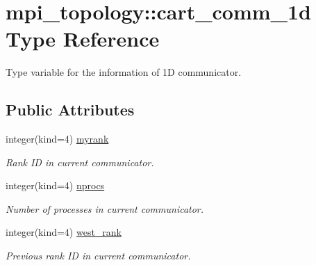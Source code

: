 \hypertarget{structmpi__topology_1_1cart__comm__1d}{}\section{mpi\+\_\+topology\+:\+:cart\+\_\+comm\+\_\+1d Type Reference}
\label{structmpi__topology_1_1cart__comm__1d}


Type variable for the information of 1D communicator.  


\subsection*{Public Attributes}
\begin{DoxyCompactItemize}
\item 
\mbox{\label{structmpi__topology_1_1cart__comm__1d_af8e266e09b59c9feb0192d6a045f5e25}} 
integer(kind=4) \hyperlink{structmpi__topology_1_1cart__comm__1d_af8e266e09b59c9feb0192d6a045f5e25}{myrank}
\begin{DoxyCompactList}\small\item\em Rank ID in current communicator. \end{DoxyCompactList}\item 
\mbox{\label{structmpi__topology_1_1cart__comm__1d_a7272e89eb5b98625a78eedbdbe3eccab}} 
integer(kind=4) \hyperlink{structmpi__topology_1_1cart__comm__1d_a7272e89eb5b98625a78eedbdbe3eccab}{nprocs}
\begin{DoxyCompactList}\small\item\em Number of processes in current communicator. \end{DoxyCompactList}\item 
\mbox{\label{structmpi__topology_1_1cart__comm__1d_a6bbcb66907f7a4ac4aca5c6821205652}} 
integer(kind=4) \hyperlink{structmpi__topology_1_1cart__comm__1d_a6bbcb66907f7a4ac4aca5c6821205652}{west\+\_\+rank}
\begin{DoxyCompactList}\small\item\em Previous rank ID in current communicator. \end{DoxyCompactList}\item 
\mbox{\label{structmpi__topology_1_1cart__comm__1d_a7895ca5472496774a4ec59055dd310b1}} 

\end{DoxyCompactItemize}
